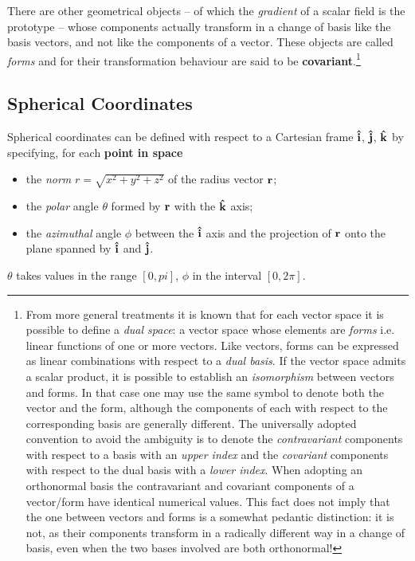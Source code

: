 There are other geometrical objects -- of which the \textit{gradient} of a scalar field is the prototype -- whose components actually transform in a change of basis like the basis vectors, and not like the components of a vector. These objects are called \textit{forms} and for their transformation behaviour are said to be \textbf{covariant}.\footnote{From more general treatments it is known that for each vector space it is possible to define a \textit{dual space}: a vector space whose elements are \textit{forms} i.e. linear functions of one or more vectors. Like vectors, forms can be expressed as linear combinations with respect to a \textit{dual basis}. If the vector space admits a scalar product, it is possible to establish an \textit{isomorphism} between vectors and forms. In that case one may use the same symbol to denote both the vector and the form, although the components of each with respect to the corresponding basis are generally different. The universally adopted convention to avoid the ambiguity is to denote the \textit{contravariant} components with respect to a basis with an \textit{upper index} and the \textit{covariant} components with respect to the dual basis with a \textit{lower index}. 
When adopting an orthonormal basis the contravariant and covariant components of a vector/form have identical numerical values. This fact does not imply that the one between vectors and forms is a somewhat pedantic distinction: it is not, as their components transform in a radically different way in a change of basis, even when the two bases involved are both orthonormal!}

\subsection{Spherical Coordinates}
Spherical coordinates can be defined with respect to a Cartesian frame $\vu{i}$, $\vu{j}$, $\vu{k}$ by specifying, for each \textbf{point in space}
\begin{itemize}
\item the \textit{norm} $r = \sqrt{x^2 + y^2 + z^2}$ of the radius vector $\vb{r}$; 
\item the \textit{polar} angle $\theta$ formed by $\vb{r}$ with the $\vu{k}$ axis;
\item the \textit{azimuthal} angle $\phi$ between the $\vu{i}$ axis and the projection of $\vb{r}$ onto the plane spanned by $\vu{i}$ and $\vu{j}$.
\end{itemize}
$\theta$ takes values in the range $[0, pi]$, $\phi$ in the interval $[0, 2\pi]$.

